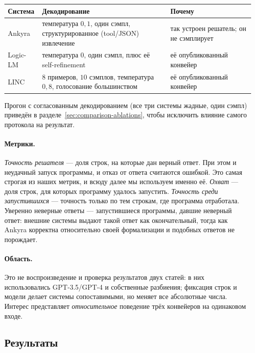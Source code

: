 \documentclass[11pt,a4paper]{article}
\begin{document}
\begin{center}
\small
\begin{tabular}{p{1.7cm}p{6.3cm}p{6.5cm}}
\toprule
\textbf{Система} & \textbf{Декодирование} & \textbf{Почему} \\
\midrule
Ankyra & температура $0{,}1$, один сэмпл, структурированное (tool/JSON) извлечение & так устроен решатель; он не сэмплирует \\
Logic-LM & температура $0$, один сэмпл, плюс её self-refinement & её опубликованный конвейер \\
LINC & 8 примеров, $10$ сэмплов, температура $0{,}8$, голосование большинством & её опубликованный конвейер \\
\bottomrule
\end{tabular}
\end{center}

Прогон с согласованным декодированием (все три системы жадные, один сэмпл) приведён в разделе~\ref{sec:comparison-ablations},
чтобы исключить влияние самого протокола на результат.

\paragraph{Метрики.} \emph{Точность решателя} — доля строк, на которые дан верный ответ. При этом и неудачный запуск программы,
и отказ от ответа считаются ошибкой. Это самая строгая из наших метрик, и всюду далее мы используем именно её. \emph{Охват}
 — доля строк, для которых программу удалось запустить. \emph{Точность среди запустившихся} — точность только по тем строкам,
где программа отработала. Уверенно неверные ответы — запустившиеся программы, давшие неверный ответ: внешние системы выдают
такой ответ как окончательный, тогда как Ankyra корректна относительно своей формализации и подобных ответов не порождает.

\paragraph{Область.} Это не воспроизведение и проверка результатов двух статей: в них использовались GPT-3.5/GPT-4 и собственные
разбиения; фиксация строк и модели делает системы сопоставимыми, но меняет все абсолютные числа. Интерес представляет \emph{относительное}
поведение трёх конвейеров на одинаковом входе.

\subsection{Результаты}
\label{sec:comparison-results}
\end{document}
